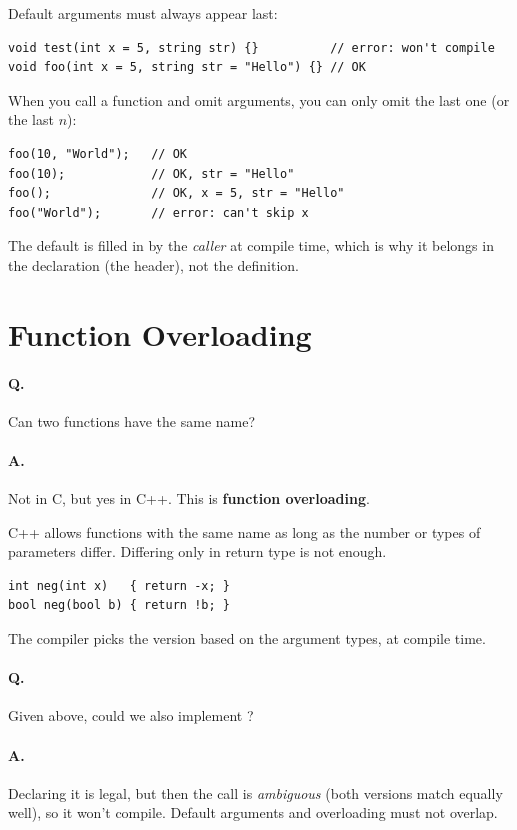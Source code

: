 Default arguments must always appear last:
\begin{lstlisting}[style=cpp]
void test(int x = 5, string str) {}          // error: won't compile
void foo(int x = 5, string str = "Hello") {} // OK
\end{lstlisting}
When you call a function and omit arguments, you can only omit the last one (or
the last $n$):
\begin{lstlisting}[style=cpp]
foo(10, "World");   // OK
foo(10);            // OK, str = "Hello"
foo();              // OK, x = 5, str = "Hello"
foo("World");       // error: can't skip x
\end{lstlisting}
The default is filled in by the \emph{caller} at compile time, which is why it
belongs in the declaration (the header), not the definition.

\section{Function Overloading}
\paragraph{Q.} Can two functions have the same name?

\paragraph{A.} Not in C, but yes in C++. This is \textbf{function overloading}.

C++ allows functions with the same name as long as the number or types of
parameters differ. Differing only in return type is not enough.
\begin{lstlisting}[style=cpp]
int neg(int x)   { return -x; }
bool neg(bool b) { return !b; }
\end{lstlisting}
The compiler picks the version based on the argument types, at compile time.

\paragraph{Q.} Given  above, could we
also implement ?

\paragraph{A.} Declaring it is legal, but then the call  is
\emph{ambiguous} (both versions match equally well), so it won't compile. Default
arguments and overloading must not overlap.

